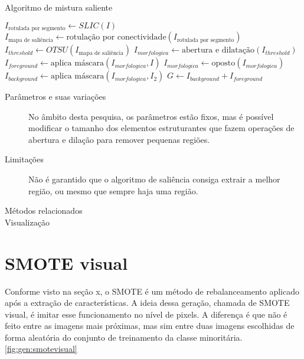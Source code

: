 \vspace{0.5cm}
\begin{algorithm}[H]
  \caption{Algoritmo de mistura saliente}
  \label{alg:saliency}
  \SetAlgoLined

  $I_{\text{rotulada por segmento}} \gets SLIC(I)$\;
  $I_{\text{mapa de saliência}} \gets \text{rotulação por conectividade}(I_{\text{rotulada por segmento}})$\;
  $I_{threshold} \gets OTSU(I_{\text{mapa de saliência}})$\;
  $I_{morfologica} \gets \text{abertura e dilatação} (I_{threshold})$\;
  $I_{foreground} \gets \text{aplica máscara}(I_{morfologica}, I) $\;
  $I_{morfologica} \gets \text{oposto}(I_{morfologica})$\;
  $I_{background} \gets \text{aplica máscara}(I_{morfologica}, I_2) $\;
  $G \gets I_{background} + I_{foreground}$\;
\end{algorithm}
\vspace{0.5cm}

\begin{description}
\item[Parâmetros e suas variações] No âmbito desta pesquisa, os parâmetros estão
fixos, mas é possível modificar o tamanho dos elementos estruturantes que fazem
operações de abertura e dilação para remover pequenas regiões.

\item[Limitações] Não é garantido que o algoritmo de saliência consiga extrair
a melhor região, ou mesmo que sempre haja uma região.

\item[Métodos relacionados]
\item[Visualização]
\end{description}
\section{SMOTE visual}

Conforme visto na seção x, o SMOTE é um método de rebalanceamento aplicado após
a extração de características. A ideia dessa geração, chamada de SMOTE visual,
é imitar esse funcionamento no nível de pixels. A diferença é que não é feito
entre as imagens mais próximas, mas sim entre duas imagens escolhidas de forma
aleatória do conjunto de treinamento da classe minoritária.
\ref{fig:gen:smotevisual}

